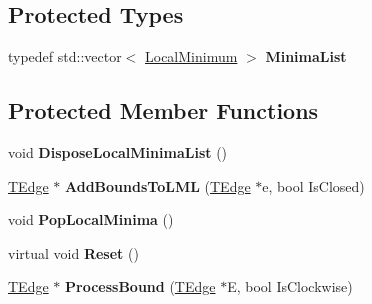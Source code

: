 \subsection*{Protected Types}
\begin{DoxyCompactItemize}
\item 
\mbox{\label{class_clipper_lib_1_1_clipper_base_addb22572066d3983dcd5797c542df00b}} 
typedef std\+::vector$<$ \mbox{\hyperlink{struct_clipper_lib_1_1_local_minimum}{Local\+Minimum}} $>$ {\bfseries Minima\+List}
\end{DoxyCompactItemize}
\subsection*{Protected Member Functions}
\begin{DoxyCompactItemize}
\item 
\mbox{\label{class_clipper_lib_1_1_clipper_base_a311dbbec1454ab7965e363a0359f5ee4}} 
void {\bfseries Dispose\+Local\+Minima\+List} ()
\item 
\mbox{\label{class_clipper_lib_1_1_clipper_base_a906ea17c9dc8822d689e54c3243e7f58}} 
\mbox{\hyperlink{struct_clipper_lib_1_1_t_edge}{T\+Edge}} $\ast$ {\bfseries Add\+Bounds\+To\+L\+ML} (\mbox{\hyperlink{struct_clipper_lib_1_1_t_edge}{T\+Edge}} $\ast$e, bool Is\+Closed)
\item 
\mbox{\label{class_clipper_lib_1_1_clipper_base_a9554e9f2273c39e0f5f07d3cd73533e6}} 
void {\bfseries Pop\+Local\+Minima} ()
\item 
\mbox{\label{class_clipper_lib_1_1_clipper_base_a125febb065f23fc55dafffe8d185b642}} 
virtual void {\bfseries Reset} ()
\item 
\mbox{\label{class_clipper_lib_1_1_clipper_base_a292655c74a7e70a8b8829337c632bdf0}} 
\mbox{\hyperlink{struct_clipper_lib_1_1_t_edge}{T\+Edge}} $\ast$ {\bfseries Process\+Bound} (\mbox{\hyperlink{struct_clipper_lib_1_1_t_edge}{T\+Edge}} $\ast$E, bool Is\+Clockwise)
\item 
\mbox{\label{class_clipper_lib_1_1_clipper_base_ae57efb542cfbbc42d000815e8a2e2877}} 

\end{DoxyCompactItemize}
